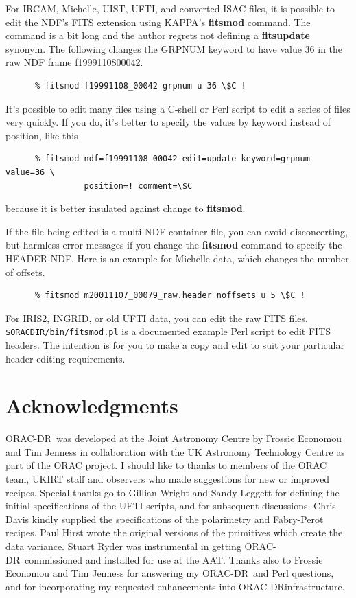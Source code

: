 \documentclass[twoside,11pt]{article}
\newcommand{\xref}[3]{#1}
\renewcommand{\_}{\texttt{\symbol{95}}}
\newcommand{\KAPPA}{{\footnotesize KAPPA}}
\newcommand{\ORACDR}{{\footnotesize ORAC-DR}}
\begin{document}
For IRCAM, Michelle, UIST, UFTI, and converted ISAC files, it is
possible to edit the NDF's
\xref{FITS extension}{sun95}{se_fitsairlock} using \KAPPA's
\xref{{\bf fitsmod}}{sun95}{FITSMOD} command.  The command is a bit
long and the author regrets not defining a {\bf fitsupdate} synonym.
The following changes the GRPNUM keyword to have value 36 in the raw
NDF frame f19991108\_00042.

\begin{verbatim}
      % fitsmod f19991108_00042 grpnum u 36 \$C !
\end{verbatim}

It's possible to edit many files using a \xref{C-shell}{sc4}{} or Perl
script to edit a series of files very quickly.  If you do, it's better
to specify the values by keyword instead of position, like this

\begin{verbatim}
      % fitsmod ndf=f19991108_00042 edit=update keyword=grpnum value=36 \
                position=! comment=\$C
\end{verbatim}
because it is better insulated against change to {\bf fitsmod}.

If the file being edited is a multi-NDF container file, you can avoid
disconcerting, but harmless error messages if you change the {\bf
fitsmod} command to specify the HEADER NDF.  Here is an example for
Michelle data, which changes the number of offsets.

\begin{verbatim}
      % fitsmod m20011107_00079_raw.header noffsets u 5 \$C !
\end{verbatim}

For IRIS2, INGRID, or old UFTI data, you can edit the raw FITS files.
{\tt\$ORAC\_DIR/bin/fitsmod.pl} is a documented example Perl script to
edit FITS headers.  The intention is for you to make a copy and edit
to suit your particular header-editing requirements.

\section{Acknowledgments}

\ORACDR\ was developed at the Joint Astronomy Centre by Frossie
Economou and Tim Jenness in collaboration with the UK Astronomy
Technology Centre as part of the ORAC project.  I should like to
thanks to members of the ORAC team, UKIRT staff and observers who made
suggestions for new or improved recipes.  Special thanks go to Gillian
Wright and Sandy Leggett for defining the initial specifications of
the UFTI scripts, and for subsequent discussions.  Chris Davis kindly
supplied the specifications of the polarimetry and Fabry-Perot
recipes.  Paul Hirst wrote the original versions of the primitives
which create the data variance. Stuart Ryder was instrumental in
getting \ORACDR\ commissioned and installed for use at the AAT.
Thanks also to Frossie Economou and Tim Jenness for answering my
\ORACDR\ and Perl questions, and for incorporating my requested
enhancements into \ORACDR infrastructure.
\end{document}
